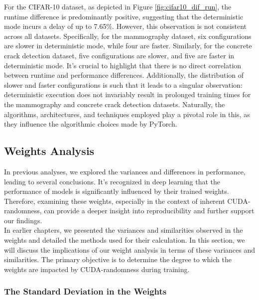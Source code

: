 For the CIFAR-10 dataset, as depicted in Figure \ref{fig:cifar10_dif_run}, the runtime difference is predominantly positive, suggesting that the deterministic mode incurs a delay of up to 7.65\%. However, this observation is not consistent across all datasets. Specifically, for the mammography dataset, six configurations are slower in deterministic mode, while four are faster. Similarly, for the concrete crack detection dataset, five configurations are slower, and five are faster in deterministic mode. It's crucial to highlight that there is no direct correlation between runtime and performance differences. Additionally, the distribution of slower and faster configurations is such that it leads to a singular observation: deterministic execution does not invariably result in prolonged training times for the mammography and concrete crack detection datasets. Naturally, the algorithms, architectures, and techniques employed play a pivotal role in this, as they influence the algorithmic choices made by PyTorch.\\

\subsection{Weights Analysis}
In previous analyses, we explored the variances and differences in performance, leading to several conclusions. It's recognized in deep learning that the performance of models is significantly influenced by their trained weights. Therefore, examining these weights, especially in the context of inherent CUDA-randomness, can provide a deeper insight into reproducibility and further support our findings.\\

In earlier chapters, we presented the variances and similarities observed in the weights and detailed the methods used for their calculation. In this section, we will discuss the implications of our weight analysis in terms of these variances and similarities. The primary objective is to determine the degree to which the weights are impacted by CUDA-randomness during training.

\subsubsection*{The Standard Deviation in the Weights}

